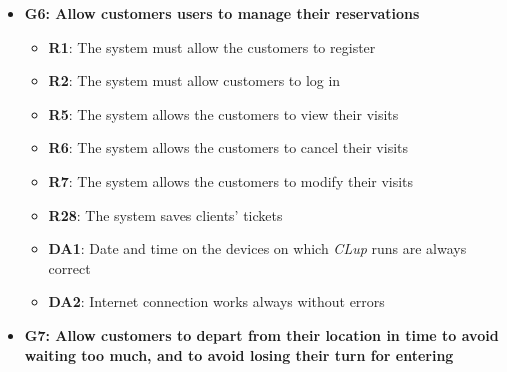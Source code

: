 \documentclass{article}
\begin{document}
\begin{itemize}
\begin{itemize}
					\end{itemize}

				\item {\bfseries G6: Allow customers users to manage their reservations}	

					\begin{itemize}
						\item {\bfseries R1}: The system must allow the customers to register
						\item {\bfseries R2}: The system must allow customers to log in
						\item {\bfseries R5}: The system allows the customers to view their visits
						\item {\bfseries R6}: The system allows the customers to cancel their visits
						\item {\bfseries R7}: The system allows the customers to modify their visits
						\item {\bfseries R28}: The system saves clients' tickets \\
		
						\item {\bfseries DA1}: Date and time on the devices on which \emph{CLup} runs are always correct
						\item {\bfseries DA2}: Internet connection works always without errors
							
					\end{itemize}

				 
				
				\item {\bfseries G7: Allow customers to depart from their location in time to avoid waiting too much, and to avoid losing their turn for entering}	


\end{itemize}
\end{document}
